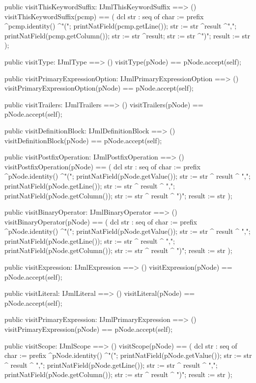 \begin{vdm_al}
  public visitThisKeywordSuffix: IJmlThisKeywordSuffix ==> ()
  visitThisKeywordSuffix(pcmp) ==
    ( dcl str : seq of char := prefix ^pcmp.identity() ^"(";
      printNatField(pcmp.getLine());
      str := str ^result ^",";
      printNatField(pcmp.getColumn());
      str := str ^result;
      str := str ^")";
      result := str );

  public visitType: IJmlType ==> ()
  visitType(pNode) == pNode.accept(self);

  public visitPrimaryExpressionOption: IJmlPrimaryExpressionOption ==> ()
  visitPrimaryExpressionOption(pNode) == pNode.accept(self);

  public visitTrailers: IJmlTrailers ==> ()
  visitTrailers(pNode) == pNode.accept(self);

  public visitDefinitionBlock: IJmlDefinitionBlock ==> ()
  visitDefinitionBlock(pNode) == pNode.accept(self);

  public visitPostfixOperation: IJmlPostfixOperation ==> ()
  visitPostfixOperation(pNode) == 
    ( dcl str : seq of char := prefix ^pNode.identity() ^"(";
      printNatField(pNode.getValue());
      str := str ^ result ^ ",";
      printNatField(pNode.getLine());
      str := str ^ result ^ ",";
      printNatField(pNode.getColumn());
      str := str ^ result ^ ")";
      result := str );

  public visitBinaryOperator: IJmlBinaryOperator ==> ()
  visitBinaryOperator(pNode) == 
    ( dcl str : seq of char := prefix ^pNode.identity() ^"(";
      printNatField(pNode.getValue());
      str := str ^ result ^ ",";
      printNatField(pNode.getLine());
      str := str ^ result ^ ",";
      printNatField(pNode.getColumn());
      str := str ^ result ^ ")";
      result := str );

  public visitExpression: IJmlExpression ==> ()
  visitExpression(pNode) == pNode.accept(self);

  public visitLiteral: IJmlLiteral ==> ()
  visitLiteral(pNode) == pNode.accept(self);

  public visitPrimaryExpression: IJmlPrimaryExpression ==> ()
  visitPrimaryExpression(pNode) == pNode.accept(self);

  public visitScope: IJmlScope ==> ()
  visitScope(pNode) == 
    ( dcl str : seq of char := prefix ^pNode.identity() ^"(";
      printNatField(pNode.getValue());
      str := str ^ result ^ ",";
      printNatField(pNode.getLine());
      str := str ^ result ^ ",";
      printNatField(pNode.getColumn());
      str := str ^ result ^ ")";
      result := str );


\end{vdm_al}
